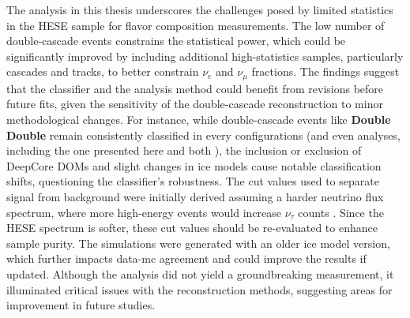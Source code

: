 The analysis in this thesis underscores the challenges posed by limited statistics in the HESE sample for flavor composition measurements. The low number of double-cascade events constrains the statistical power, which could be significantly improved by including additional high-statistics samples, particularly cascades and tracks, to better constrain $\nu_e$ and $\nu_\mu$ fractions. The findings suggest that the classifier and the analysis method could benefit from revisions before future fits, given the sensitivity of the double-cascade reconstruction to minor methodological changes. For instance, while double-cascade events like \textbf{Double Double} remain consistently classified in every configurations (and even analyses, including the one presented here and both  ), the inclusion or exclusion of DeepCore DOMs and slight changes in ice models cause notable classification shifts, questioning the classifier’s robustness. The cut values used to separate signal from background were initially derived assuming a harder neutrino flux spectrum, where more high-energy events would increase $\nu_\tau$ counts . Since the HESE spectrum is softer, these cut values should be re-evaluated to enhance sample purity. The simulations were generated with an older ice model version, which further impacts data-mc agreement and could improve the results if updated. Although the analysis did not yield a groundbreaking measurement, it illuminated critical issues with the reconstruction methods, suggesting areas for improvement in future studies. 

